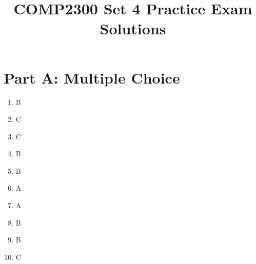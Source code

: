 \documentclass[11pt]{article}
\title{COMP2300 Set 4 Practice Exam Solutions}
\date{}
\begin{document}
\maketitle

\section*{Part A: Multiple Choice}
\begin{enumerate}[label=\textbf{A\arabic*.}]
  \item B
  \item C
  \item C
  \item B
  \item B
  \item A
  \item A
  \item B
  \item B
  \item C
\end{enumerate}
\end{document}
